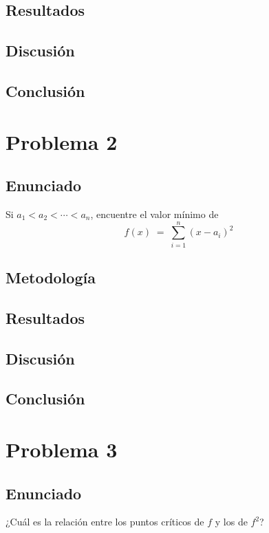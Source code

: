 \documentclass{article}
\begin{document}
\subsection{Resultados}
\setcounter{equation}{0}

\subsection{Discusión}

\subsection{Conclusión}

\section{Problema 2}

\subsection{Enunciado}
Si $a_{1} < a_{2} < \cdots < a_{n}$, encuentre el valor mínimo de
\[
f(x) \;=\; \sum_{i=1}^{n} (x - a_i)^2
\]

\subsection{Metodología}

\subsection{Resultados}
\setcounter{equation}{0}

\subsection{Discusión}

\subsection{Conclusión}

\section{Problema 3}

\subsection{Enunciado}
¿Cuál es la relación entre los puntos críticos de $f$ y los de $f^{2}$?
\end{document}
